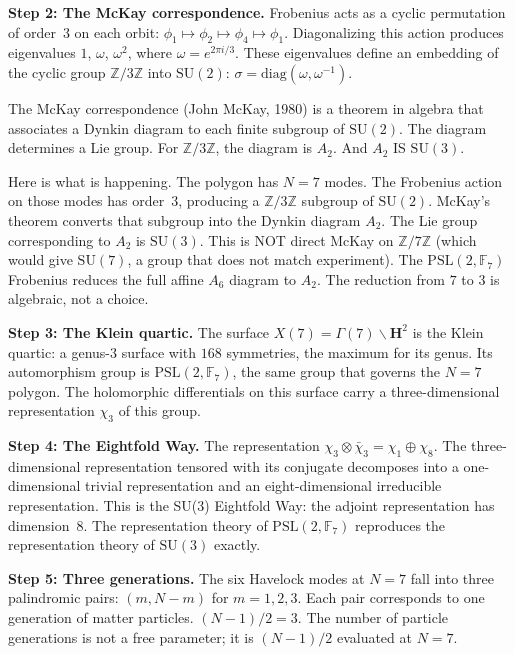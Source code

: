 \textbf{Step 2: The McKay correspondence.} Frobenius acts as a
cyclic permutation of order~$3$ on each orbit: $\phi_1 \mapsto \phi_2
\mapsto \phi_4 \mapsto \phi_1$. Diagonalizing this action produces
eigenvalues $1$, $\omega$, $\omega^2$, where
$\omega = e^{2\pi i/3}$. These eigenvalues define an embedding of the
cyclic group $\mathbb{Z}/3\mathbb{Z}$ into $\mathrm{SU}(2)$:
$\sigma = \text{diag}(\omega, \omega^{-1})$.

The McKay correspondence (John McKay, 1980) is a theorem in algebra
that associates a Dynkin diagram to each finite subgroup of
$\mathrm{SU}(2)$. The diagram determines a Lie group. For
$\mathbb{Z}/3\mathbb{Z}$, the diagram is $A_2$. And $A_2$ IS
$\mathrm{SU}(3)$.

Here is what is happening. The polygon has
$N = 7$ modes. The Frobenius action on those modes has order~$3$,
producing a $\mathbb{Z}/3\mathbb{Z}$ subgroup of $\mathrm{SU}(2)$.
McKay's theorem converts that subgroup into the Dynkin diagram $A_2$.
The Lie group corresponding to $A_2$ is $\mathrm{SU}(3)$. This is NOT
direct McKay on $\mathbb{Z}/7\mathbb{Z}$ (which would give
$\mathrm{SU}(7)$, a group that does not match experiment). The
$\text{PSL}(2, \mathbb{F}_7)$ Frobenius reduces the full affine $A_6$
diagram to $A_2$. The reduction from $7$ to $3$ is algebraic, not a
choice.

\textbf{Step 3: The Klein quartic.} The surface
$X(7) = \Gamma(7) \backslash \mathbf{H}^2$ is the Klein quartic: a
genus-$3$ surface with $168$ symmetries, the maximum for its genus.
Its automorphism group is $\text{PSL}(2, \mathbb{F}_7)$, the same
group that governs the $N = 7$ polygon. The holomorphic differentials
on this surface carry a three-dimensional representation $\chi_3$ of
this group.

\textbf{Step 4: The Eightfold Way.} The representation
$\chi_3 \otimes \bar{\chi}_3 = \chi_1 \oplus \chi_8$. The
three-dimensional representation tensored with its conjugate
decomposes into a one-dimensional trivial representation and an
eight-dimensional irreducible representation. This is the SU(3)
Eightfold Way: the adjoint representation has dimension~$8$. The
representation theory of $\text{PSL}(2, \mathbb{F}_7)$ reproduces the
representation theory of $\mathrm{SU}(3)$ exactly.

\textbf{Step 5: Three generations.} The six Havelock modes at $N = 7$
fall into three palindromic pairs: $(m, N-m)$ for $m = 1, 2, 3$. Each
pair corresponds to one generation of matter particles.
$(N-1)/2 = 3$. The number of particle generations is not a free
parameter; it is $(N-1)/2$ evaluated at $N = 7$.

